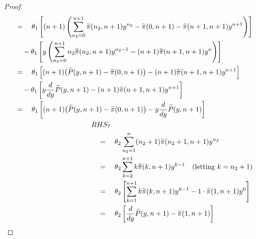 \begin{proof}
\begin{align*}
\begin{split}
            & \quad = \quad \theta_1 \left[ (n+1) \left( \sum_{n_2=0}^{n+1} \widetilde{\pi}(n_2,n+1) y^{n_2} - \widetilde{\pi}(0,n+1) - \widetilde{\pi}(n+1,n+1) y^{n+1} \right) \right] \\
            & \quad \quad - \theta_1 \left[ y \left( \sum_{n_2=0}^{n+1} n_2 \widetilde{\pi}(n_2,n+1) y^{n_2-1} - (n+1) \widetilde{\pi}(n+1,n+1) y^n \right) \right] \\
            & \quad = \quad \theta_1 \left[ (n+1) \big( \widetilde{P}(y,n+1) - \widetilde{\pi}(0,n+1) \big) - (n+1) \widetilde{\pi}(n+1,n+1) y^{n+1} \right] \\
            & \quad \quad - \theta_1 \left[ y \frac{d}{dy} \widetilde{P}(y,n+1) - (n+1) \widetilde{\pi}(n+1,n+1) y^{n+1} \right] \\
            & \quad = \quad \theta_1 \left[ (n+1) \big( \widetilde{P}(y,n+1) - \widetilde{\pi}(0,n+1) \big) - y \frac{d}{dy} \widetilde{P}(y,n+1) \right]
        \end{split} \\
        \begin{split}
            & RHS_7 \\
            & \quad = \quad \theta_2 \sum_{n_2=1}^{n} (n_2+1) \widetilde{\pi}(n_2+1,n+1) y^{n_2} \\
            & \quad = \quad \theta_2 \sum_{k=2}^{n+1} k \widetilde{\pi}(k,n+1) y^{k-1} \quad \text{(letting $k = n_2+1$)} \\
            & \quad = \quad \theta_2 \left[ \sum_{k=1}^{n+1} k \widetilde{\pi}(k,n+1) y^{k-1} - 1 \cdot \widetilde{\pi}(1,n+1) y^0 \right] \\
            & \quad = \quad \theta_2 \left[ \frac{d}{dy} \widetilde{P}(y,n+1) - \widetilde{\pi}(1,n+1) \right]
        \end{split}
    \end{align*}
    

\end{proof}
